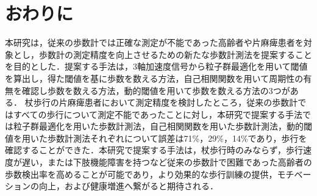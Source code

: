\chapter{おわりに}
本研究は，従来の歩数計では正確な測定が不能であった高齢者や片麻痺患者を対象とし，歩数計の測定精度を向上させるための新たな歩数計測法を提案することを目的とした．提案する手法は，3軸加速度信号から粒子群最適化を用いて閾値を算出し，得た閾値を基に歩数を数える方法，自己相関関数を用いて周期性の有無を確認し歩数を数える方法，動的閾値を用いて歩数を数える方法の3つがある．
杖歩行の片麻痺患者において測定精度を検討したところ，従来の歩数計ではすべての歩行について測定不能であったことに対し，本研究で提案する手法では粒子群最適化を用いた歩数計測法，自己相関関数を用いた歩数計測法，動的閾値を用いた歩数計測法それぞれについて誤差は71\%，29\%，14\%であり，歩行を確認することができた．本研究で提案する手法は，杖歩行時のみならず，歩行速度が遅い，または下肢機能障害を持つなど従来の歩数計で困難であった高齢者の歩数検出率を高めることが可能であり，より効果的な歩行訓練の提供，モチベーションの向上，および健康増進へ繋がると期待される．
